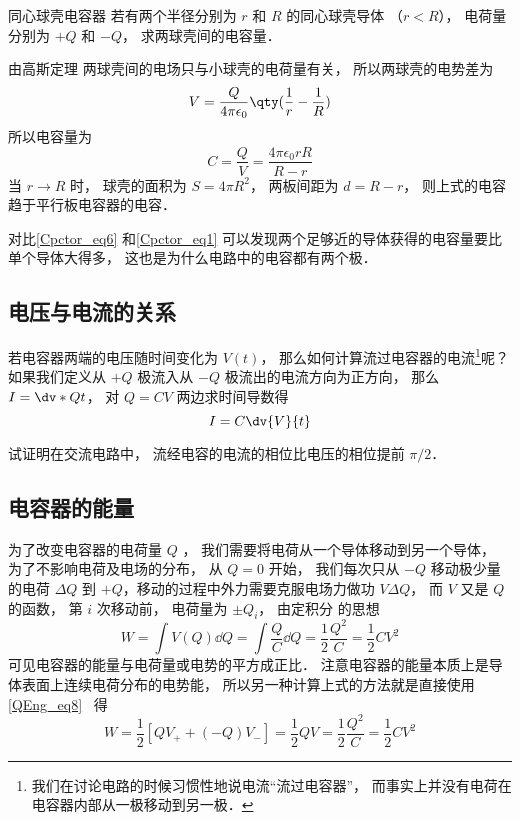 \begin{example}{同心球壳电容器}
若有两个半径分别为 $r$ 和 $R$ 的同心球壳导体 （$r < R$）， 电荷量分别为 $+Q$ 和 $-Q$， 求两球壳间的电容量．

由高斯定理%
两球壳间的电场只与小球壳的电荷量有关， 所以两球壳的电势差为
\begin{equation}
V = \frac{Q}{4\pi\epsilon_0} \qty(\frac 1r - \frac 1R)
\end{equation}
所以电容量为
\begin{equation}\label{Cpctor_eq6}
C = \frac QV = \frac{4\pi\epsilon_0 rR}{R - r}
\end{equation}
当 $r\to R$ 时， 球壳的面积为 $S = 4\pi R^2$， 两板间距为 $d = R - r$， 则上式的电容趋于平行板电容器的电容．
\end{example}

对比\autoref{Cpctor_eq6} 和\autoref{Cpctor_eq1} 可以发现两个足够近的导体获得的电容量要比单个导体大得多， 这也是为什么电路中的电容都有两个极．

\subsection{电压与电流的关系}
若电容器两端的电压随时间变化为 $V(t)$， 那么如何计算流过电容器的电流\footnote{我们在讨论电路的时候习惯性地说电流“流过电容器”， 而事实上并没有电荷在电容器内部从一极移动到另一极．}呢？ 如果我们定义从 $+Q$ 极流入从 $-Q$ 极流出的电流方向为正方向， 那么 $I = \dv*{Q}{t}$， 对 $Q = CV$ 两边求时间导数得
\begin{equation}
I = C\dv{V}{t}
\end{equation}
\begin{exercise}{}
试证明在交流电路中， 流经电容的电流的相位比电压的相位提前 $\pi/2$．
\end{exercise}

\subsection{电容器的能量}
为了改变电容器的电荷量 $Q$ ， 我们需要将电荷从一个导体移动到另一个导体， 为了不影响电荷及电场的分布， 从 $Q = 0$ 开始， 我们每次只从 $-Q$ 移动极少量的电荷 $\Delta Q$ 到 $+Q$，移动的过程中外力需要克服电场力做功 $V\Delta Q$， 而 $V$ 又是 $Q$ 的函数， 第 $i$ 次移动前， 电荷量为 $\pm Q_i$， 由定积分 的思想
\begin{equation}
W = \int V(Q) \dd{Q} = \int \frac{Q}{C} \dd{Q} = \frac12 \frac{Q^2}{C} = \frac12 CV^2
\end{equation}
可见电容器的能量与电荷量或电势的平方成正比． 注意电容器的能量本质上是导体表面上连续电荷分布的电势能， 所以另一种计算上式的方法就是直接使用\autoref{QEng_eq8}~ 得
\begin{equation}
W = \frac12 [QV_+ + (-Q)V_-] = \frac12 QV = \frac12 \frac{Q^2}{C} = \frac12 CV^2 
\end{equation}
